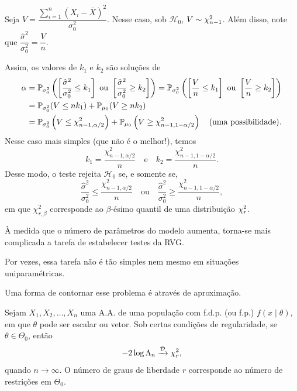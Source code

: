 \begin{theorem}[$\mathcal{H}_0:\sigma^2=\sigma_0^2$ \emph{vs.} $\mathcal{H}_1:\sigma^2\neq\sigma_0^2$ -- $\mu$ desconhecido]
Seja $V=\dfrac{\sum_{i=1}^n\left(X_i-\bar{X}\right)^2}{\sigma_0^2}$. Nesse caso, sob $\mathcal{H}_0$, $V\sim\chidist{n-1}$. Além disso, note que $\dfrac{\hat{\sigma}^2}{\sigma_0^2}=\dfrac{V}{n}$.

Assim, os valores de $k_1$ e $k_2$ são soluções de
\begin{align}
\alpha &= \P_{\sigma_0^2}\left(\left[\frac{\hat{\sigma}^2}{\sigma_0^2}\leq k_1\right]\text{ ou }\left[\frac{\hat{\sigma}^2}{\sigma_0^2}\geq k_2\right]\right) = \P_{\sigma_0^2}\left(\left[\frac{V}{n}\leq k_1\right]\text{ ou }\left[\frac{V}{n}\geq k_2\right]\right)\notag\\
&= \P_{\sigma_0^2}(V\leq nk_1)+\P_{\mu_0}(V\geq nk_2)\notag\\
&= \P_{\sigma_0^2}\left(V\leq\chi^2_{n-1,\alpha/2}\right)+\P_{\mu_0}\left(V\geq\chi^2_{n-1,1-\alpha/2}\right) \quad \text{(uma possibilidade).}
\end{align}
Nesse caso mais simples (que não é o melhor!), temos
\begin{equation}
k_1=\frac{\chi^2_{n-1,\alpha/2}}{n} \quad \text{e} \quad k_2=\frac{\chi^2_{n-1,1-\alpha/2}}{n}.
\end{equation}
Desse modo, o teste rejeita $\mathcal{H}_0$ se, e somente se,
\begin{equation}
\frac{\hat{\sigma}^2}{\sigma_0^2}\leq\frac{\chi^2_{n-1,\alpha/2}}{n} \quad \text{ou} \quad \frac{\hat{\sigma}^2}{\sigma_0^2}\geq\frac{\chi^2_{n-1,1-\alpha/2}}{n},
\end{equation}
em que $\chi^2_{r,\beta}$ corresponde ao $\beta$-ésimo quantil de uma distribuição $\chidist{r}$.
\end{theorem}

À medida que o número de parâmetros do modelo aumenta, torna-se mais complicada a tarefa de estabelecer testes da RVG.

Por vezes, essa tarefa não é tão simples nem mesmo em situações uniparamétricas.

Uma forma de contornar esse problema é através de aproximação.

\begin{theorem}
Sejam $X_1,X_2,\ldots,X_n$ uma A.A. de uma população com f.d.p. (ou f.p.) $f(x\mid\theta)$, em que $\theta$ pode ser escalar ou vetor. Sob certas condições de regularidade, se $\theta\in\Theta_0$, então
\begin{equation}
-2\log\Lambda_n \toD \chidist{r},
\end{equation}
quando $n\to\infty$. O número de graus de liberdade $r$ corresponde ao número de restrições em $\Theta_0$.
\end{theorem}

